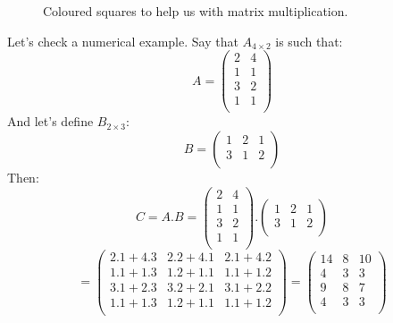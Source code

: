 \documentclass[600paper, 11pt,twoside,openany]{kdp}
\begin{document}
\begin{figure}[h!]
\begin{center}
\end{center}
\vspace*{3pt}
\caption{Coloured squares to help us with matrix multiplication.}
\end{figure}
\par 
\vspace{-3pt}
\indent Let's check a numerical example. Say that $A_{4 \times 2}$ is such that:
\[
A = \begin{pmatrix}
2 & 4  \\
1 & 1  \\
3 & 2  \\
1 & 1  \\
\end{pmatrix}
\]
\indent And let's define $B_{2 \times 3}$:
\[B = \begin{pmatrix}
1 & 2 & 1   \\
3 & 1 & 2  \\
\end{pmatrix}
\]
\indent Then:
\[
C = A.B =  \begin{pmatrix}
2 & 4  \\
1 & 1  \\
3 & 2  \\
1 & 1  \\
\end{pmatrix}.\begin{pmatrix}
1 & 2 & 1   \\
3 & 1 & 2  \\
\end{pmatrix}
\]
\[
 =  \begin{pmatrix}
2.1 + 4.3 & 2.2 + 4.1 & 2.1 + 4.2 \\
1.1 + 1.3 & 1.2 + 1.1 & 1.1 + 1.2 \\
3.1 + 2.3 & 3.2 + 2.1 & 3.1 + 2.2 \\
1.1 + 1.3 & 1.2 + 1.1 & 1.1 + 1.2 \\ 
\end{pmatrix}
= 
\begin{pmatrix}
14 & 8 & 10   \\
4 & 3 & 3 \\
9 & 8 & 7 \\
4 & 3 & 3 \\
\end{pmatrix}
\]
\end{document}
